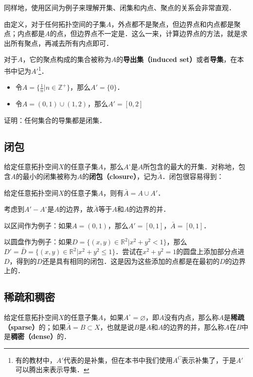 同样地，使用区间为例子来理解开集、闭集和内点、聚点的关系会非常直观．

由定义，对于任何拓扑空间的子集$A$，外点都不是聚点，但边界点和内点都是聚点；内点都是$A$的点，但边界点不一定是．这么一来，计算边界点的方法，就是求出所有聚点，再减去所有内点即可．

对于$A$，它的聚点构成的集合被称为$A$的\textbf{导出集（induced set）}或者\textbf{导集}，在本书中记为$A'$\footnote{有的教材中，$A'$代表的是补集，但在本书中我们使用$A^C$表示补集了，于是$A'$可以腾出来表示导集．}．

\begin{example}{}
\begin{itemize}
\item 令$A=\{\frac{1}{n}|n\in\mathbb{Z}^+\}$，那么$A'=\{0\}$．
\item 令$A=(0,1)\cup(1,2)$，那么$A'=[0,2]$
\end{itemize}
\end{example}

\begin{exercise}{}
证明：任何集合的导集都是闭集．
\end{exercise}

\subsection{闭包}

给定任意拓扑空间$X$的任意子集$A$，那么$A^\circ$是$A$所包含的最大的开集．对称地，包含$A$的最小的闭集被称为$A$的\textbf{闭包（closure）}，记为$\bar{A}$．闭包很容易得到：

\begin{theorem}{}
给定任意拓扑空间$X$的任意子集$A$，则有$\bar{A}=A\cup A'$．
\end{theorem}
\begin{corollary}{}
考虑到$A'-A^\circ$是$A$的边界，故$\bar{A}$等于$A$和$A$的边界的并．
\end{corollary}

以区间作为例子：如果$A=(0,1)$，那么$A'=[0,1]$，$\bar{A}=[0,1]$．

以圆盘作为例子：如果$D=\{(x,y)\in\mathbb{R}^2|x^2+y^2<1\}$，那么$D'=\bar{D}=\{(x,y)\in\mathbb{R}^2|x^2+y^2\leq1\}$．尝试在$x^2+y^2=1$的圆盘上添加部分点进$D$，得到的$D$还是具有相同的闭包．这是因为这些添加的点都是在最初的$D$的边界上的．

\subsection{稀疏和稠密}
给定任意拓扑空间$X$的任意子集$A$，如果$A^\circ=\varnothing$，即$A$没有内点，那么称$A$是\textbf{稀疏（sparse）}的；如果$\bar{A}=B\subset X$，也就是说$B$是$A$和$A$的边界的并，那么称$A$在$B$中是\textbf{稠密（dense）}的．

